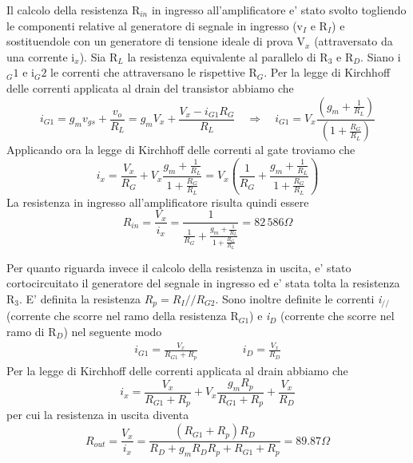 \documentclass[a4paper,10pt]{article}
\begin{document}
Il calcolo della resistenza R$_{in}$ in ingresso all'amplificatore e' stato svolto togliendo le componenti relative al generatore di segnale in ingresso (v$_I$ e R$_I$) e sostituendole con un generatore di tensione ideale di prova V$_x$ (attraversato da una corrente i$_x$). Sia R$_L$ la resistenza equivalente al parallelo di R$_3$ e R$_D$. Siano i$_G1$ e i$_G2$ le correnti che attraversano le rispettive R$_G$.
Per la legge di Kirchhoff delle correnti applicata al drain del transistor abbiamo che
\begin{equation*}
i_{G1} = g_mv_{gs} + \frac{v_o}{R_L} = g_mV_x+ \frac{V_x-i_{G1}R_G}{R_L} \quad \Rightarrow \quad i_{G1} = V_x \frac{\left(g_m+\frac{1}{R_L}\right)}{\left(1+\frac{R_G}{R_L}\right)}
\end{equation*}
Applicando ora la legge di Kirchhoff delle correnti al gate troviamo che
\begin{equation*}
i_x=\frac{V_x}{R_G}+V_x\frac{g_m+\frac{1}{R_L}}{1+\frac{R_G}{R_L}} = V_x \left( \frac{1}{R_G} + \frac{g_m+\frac{1}{R_L}}{1+\frac{R_G}{R_L}} \right)
\end{equation*}
La resistenza in ingresso all'amplificatore risulta quindi essere
\begin{equation}
\label{eq2-4}
R_{in} = \frac{V_x}{i_x} = \frac{1}{\frac{1}{R_G} + \frac{g_m+\frac{1}{R_L}}{1+\frac{R_G}{R_L}}} = 82\,586\Omega
\end{equation}

Per quanto riguarda invece il calcolo della resistenza in uscita, e' stato cortocircuitato il generatore del segnale in ingresso ed e' stata tolta la resistenza R$_3$. E' definita la resistenza $R_p=R_I//R_{G2}$. Sono inoltre definite le correnti \textit{i$_{//}$} (corrente che scorre nel ramo della resistenza R$_{G1}$) e \textit{i$_D$} (corrente che scorre nel ramo di R$_D$) nel seguente modo
\begin{gather*}
i_{G1} = \frac{V_x}{R_{G1}+R_p}  \qquad \qquad i_D=\frac{V_x}{R_D}
\end{gather*}
Per la legge di Kirchhoff delle correnti applicata al drain abbiamo che 
\begin{equation*}
i_x = \frac{V_x}{R_{G1}+R_p}+V_x\frac{g_mR_p}{R_{G1}+R_p}+\frac{V_x}{R_D}
\end{equation*}
per cui la resistenza in uscita diventa
\begin{equation}
\label{eq2-5}
R_{out} = \frac{V_x}{i_x} = \frac{(R_{G1}+R_p)R_D}{R_D+g_mR_DR_p+R_{G1}+R_p} = 89.87\Omega
\end{equation}
\end{document}
